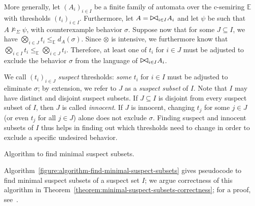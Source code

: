 \documentclass[a4paper]{article}
\newcommand{\abscsemiring}{\mathbb{E}}
\theoremstyle{definition}
\newcommand{\bigbowtie}{\text{\Large $\bowtie$}}
\begin{document}
More generally, let ${(A_i)}_{i \in I}$ be a finite family of automata over the c-semiring $\abscsemiring$ with thresholds ${(t_i)}_{i \in I}$. Furthermore, let $A = \bigbowtie_{i \in I} A_i$ and let $\psi$ be such that $A \not\models_\Sigma \psi$, with counterexample behavior $\sigma$. Suppose now that for some $J \subseteq I$, we have \( \bigotimes\nolimits_{i \in J} t_i \leq_\abscsemiring d_A(\sigma) \). Since $\otimes$ is intensive, we furthermore know that \( \bigotimes\nolimits_{i \in I} t_i \leq_\abscsemiring \bigotimes\nolimits_{i \in J} t_i \). Therefore, at least one of $t_i$ for $i \in J$ must be adjusted to exclude the behavior $\sigma$ from the language of $\bigbowtie_{i \in I} A_i$.

We call ${(t_i)}_{i \in J}$ \emph{suspect} thresholds: \emph{some} $t_i$ for $i \in I$ must be adjusted to eliminate $\sigma$; by extension, we refer to $J$ as a \emph{suspect subset} of $I$. Note that $I$ may have distinct and disjoint suspect subsets.
If $J \subseteq I$ is disjoint from every suspect subset of $I$, then $J$ is called \emph{innocent}. If $J$ is innocent, changing $t_j$  for some $j \in J$ (or even $t_j$ for all $j \in J$) alone does not exclude $\sigma$. Finding suspect and innocent subsets of $I$ thus helps in finding out which thresholds need to change in order to exclude a specific undesired behavior.
\begin{algorithm}
\caption{Algorithm to find minimal suspect subsets.}\label{figure:algorithm-find-minimal-suspect-subsets}
\end{algorithm}

Algorithm~\ref{figure:algorithm-find-minimal-suspect-subsets} gives pseudocode to find minimal suspect subsets of a suspect set $I$; we argue correctness of this algorithm in Theorem~\ref{theorem:minimal-suspect-subsets-correctness}; for a proof, see~\cite{kappe-arbab-talcott-2017-techreport}.
\end{document}
